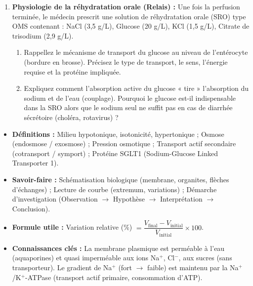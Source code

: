 \documentclass[11pt]{article}
\newcounter{popsec}
\newcounter{popsub}
\newcommand{\courssub}[1]{%
  \stepcounter{popsub}%
  \par\vspace{9pt}\noindent{\popxbold\fontsize{11.5}{13}\selectfont\color{popink}{\color{poporange}\thepopsec.\thepopsub}\hspace{6pt}#1}\par\nopagebreak\vspace{4pt}
}
\begin{document}
\begin{enumerate}
    \item \textbf{Physiologie de la réhydratation orale (Relais) :} Une fois la perfusion terminée, le médecin prescrit une solution de réhydratation orale (SRO) type OMS contenant : NaCl (3,5 g/L), Glucose (20 g/L), KCl (1,5 g/L), Citrate de trisodium (2,9 g/L).
    \begin{enumerate}
        \item Rappellez le mécanisme de transport du glucose au niveau de l'entérocyte (bordure en brosse). Précisez le type de transport, le sens, l'énergie requise et la protéine impliquée.
        \item Expliquez comment l'absorption active du glucose « tire » l'absorption du sodium et de l'eau (couplage). Pourquoi le glucose est-il indispensable dans la SRO alors que le sodium seul ne suffit pas en cas de diarrhée sécrétoire (choléra, rotavirus) ?
    \end{enumerate}
\end{enumerate}

\courssub{Ressources à mobiliser}
\begin{itemize}
    \item \textbf{Définitions :} Milieu hypotonique, isotonicité, hypertonique ; Osmose (endosmose / exosmose) ; Pression osmotique ; Transport actif secondaire (cotransport / symport) ; Protéine SGLT1 (Sodium-Glucose Linked Transporter 1).
    \item \textbf{Savoir-faire :} Schématisation biologique (membrane, organites, flèches d'échanges) ; Lecture de courbe (extremum, variations) ; Démarche d'investigation (Observation $\rightarrow$ Hypothèse $\rightarrow$ Interprétation $\rightarrow$ Conclusion).
    \item \textbf{Formule utile :} Variation relative (\%) $= \dfrac{V_{\text{final}} - V_{\text{initial}}}{V_{\text{initial}}} \times 100$.
    \item \textbf{Connaissances clés :} La membrane plasmique est perméable à l'eau (aquaporines) et quasi imperméable aux ions Na$^+$, Cl$^-$, aux sucres (sans transporteur). Le gradient de Na$^+$ (fort $\rightarrow$ faible) est maintenu par la Na$^+$/K$^+$-ATPase (transport actif primaire, consommation d'ATP).
\end{itemize}
\end{document}
